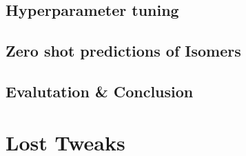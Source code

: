 \subsection{Hyperparameter tuning}
\label{sec:qm9_full_isomers_hyp_tuning}

\subsection{Zero shot predictions of Isomers}
\label{sec:qm9_full_isomers_zero_shot}

\subsection{Evalutation \& Conclusion}
\label{sec:qm9_full_isomers_conclusion}

\section{Lost Tweaks}
\label{sec:lost_tweaks}
